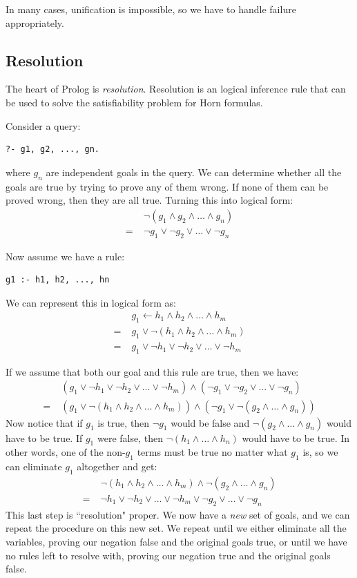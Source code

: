 \documentclass[11pt]{report}
\begin{document}
In many cases, unification is impossible, so we have to handle failure appropriately.

\subsection{Resolution}

The heart of Prolog is \emph{resolution}. Resolution is an logical inference rule that can be used to solve the satisfiability problem for Horn formulas.

Consider a query:
\begin{verbatim}
?- g1, g2, ..., gn.
\end{verbatim}
where $g_n$ are independent goals in the query. We can determine whether all the goals are true by trying to prove any of them wrong. If none of them can be proved wrong, then they are all true. Turning this into logical form:
\begin{align*}
& \neg(g_1 \wedge g_2 \wedge \ldots \wedge g_n) \\
=\; &\neg g_1 \vee \neg g_2 \vee \ldots \vee \neg g_n
\end{align*}

Now assume we have a rule:
\begin{verbatim}
g1 :- h1, h2, ..., hn
\end{verbatim}
We can represent this in logical form as:
\begin{align*}
& g_1 \leftarrow h_1 \wedge h_2 \wedge \ldots \wedge h_m \\
=\; & g_1 \vee \neg (h_1 \wedge h_2 \wedge \ldots \wedge h_m) \\
=\; & g_1 \vee \neg h_1 \vee \neg h_2 \vee \ldots \vee \neg h_m
\end{align*}

If we assume that both our goal and this rule are true, then we have:
\begin{align*}
& (g_1 \vee \neg h_1 \vee \neg h_2 \vee \ldots \vee \neg h_m) \wedge (\neg g_1 \vee \neg g_2 \vee \ldots \vee \neg g_n) \\
=\; & (g_1 \vee \neg (h_1 \wedge h_2 \wedge \ldots \wedge h_m)) \wedge (\neg g_1 \vee \neg (g_2 \wedge \ldots \wedge g_n))
\end{align*}
Now notice that if $g_1$ is true, then $\neg g_1$ would be false and $\neg (g_2 \wedge \ldots \wedge g_n)$ would have to be true. If $g_1$ were false, then $\neg (h_1 \wedge \ldots \wedge h_n)$ would have to be true. In other words, one of the non-$g_1$ terms must be true no matter what $g_1$ is, so we can eliminate $g_1$ altogether and get:
\begin{align*}
& \neg (h_1 \wedge h_2 \wedge \ldots \wedge h_m) \wedge \neg (g_2 \wedge \ldots \wedge g_n) \\
=\; & \neg h_1 \vee \neg h_2 \vee \ldots \vee \neg h_m \vee \neg g_2 \vee \ldots \vee \neg g_n
\end{align*}
This last step is ``resolution" proper. We now have a \emph{new} set of goals, and we can repeat the procedure on this new set. We repeat until we either eliminate all the variables, proving our negation false and the original goals true, or until we have no rules left to resolve with, proving our negation true and the original goals false.
\end{document}
